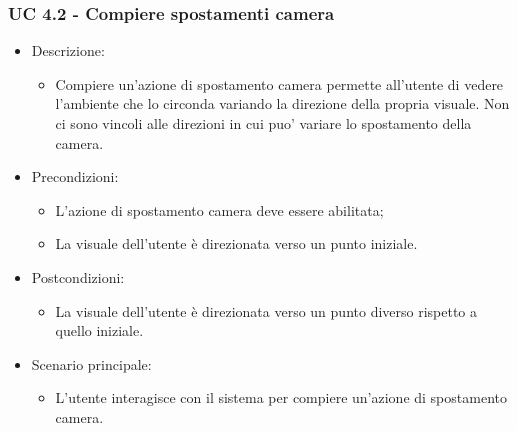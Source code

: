 \subsubsection{UC 4.2 - Compiere spostamenti camera}
\begin{itemize}

	\item Descrizione:
	\begin{itemize}
		\item Compiere un'azione di spostamento camera permette all'utente di vedere l'ambiente che lo circonda variando
la direzione della propria visuale.
\newline Non ci sono vincoli alle direzioni in cui puo' variare lo spostamento della camera.
	\end{itemize}
	
	\item Precondizioni:
	\begin{itemize}
		\item L'azione di spostamento camera deve essere abilitata;
		\item La visuale dell'utente è direzionata verso un punto iniziale.
	\end{itemize}
	
	\item Postcondizioni:
	\begin{itemize}
		\item La visuale dell'utente è direzionata verso un punto diverso rispetto a quello iniziale.
	\end{itemize}
	
	\item Scenario principale:
	\begin{itemize}
		\item L'utente interagisce con il sistema per compiere un'azione di spostamento camera.
	\end{itemize}
	
\end{itemize}


